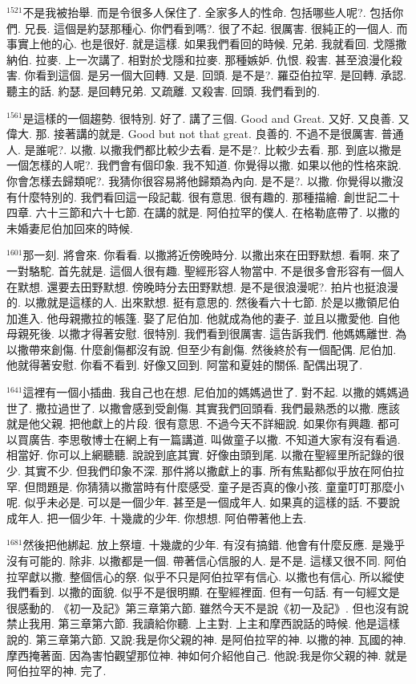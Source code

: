 \documentclass{book}
\begin{document}
$^{1521}$不是我被抬舉.
而是令很多人保住了.
全家多人的性命.
包括哪些人呢?.
包括你們.
兄長.
這個是約瑟那種心.
你們看到嗎?.
很了不起.
很厲害.
很純正的一個人.
而事實上他的心.
也是很好.
就是這樣.
如果我們看回的時候.
兄弟.
我就看回.
戈隱撒納伯.
拉麥.
上一次講了.
相對於戈隱和拉麥.
那種嫉妒.
仇恨.
殺害.
甚至浪漫化殺害.
你看到這個.
是另一個大回轉.
又是.
回頭.
是不是?.
羅亞伯拉罕.
是回轉.
承認.
聽主的話.
約瑟.
是回轉兄弟.
又疏離.
又殺害.
回頭.
我們看到的.

$^{1561}$是這樣的一個趨勢.
很特別.
好了.
講了三個.
Good and Great.
又好.
又良善.
又偉大.
那.
接著講的就是.
Good but not that great.
良善的.
不過不是很厲害.
普通人.
是誰呢?.
以撒.
以撒我們都比較少去看.
是不是?.
比較少去看.
那.
到底以撒是一個怎樣的人呢?.
我們會有個印象.
我不知道.
你覺得以撒.
如果以他的性格來說.
你會怎樣去歸類呢?.
我猜你很容易將他歸類為內向.
是不是?.
以撒.
你覺得以撒沒有什麼特別的.
我們看回這一段記載.
很有意思.
很有趣的.
那種描繪.
創世記二十四章.
六十三節和六十七節.
在講的就是.
阿伯拉罕的僕人.
在格勒底帶了.
以撒的未婚妻尼伯加回來的時候.

$^{1601}$那一刻.
將會來.
你看看.
以撒將近傍晚時分.
以撒出來在田野默想.
看啊.
來了一對駱駝.
首先就是.
這個人很有趣.
聖經形容人物當中.
不是很多會形容有一個人在默想.
還要去田野默想.
傍晚時分去田野默想.
是不是很浪漫呢?.
拍片也挺浪漫的.
以撒就是這樣的人.
出來默想.
挺有意思的.
然後看六十七節.
於是以撒領尼伯加進入.
他母親撒拉的帳篷.
娶了尼伯加.
他就成為他的妻子.
並且以撒愛他.
自他母親死後.
以撒才得著安慰.
很特別.
我們看到很厲害.
這告訴我們.
他媽媽離世.
為以撒帶來創傷.
什麼創傷都沒有說.
但至少有創傷.
然後終於有一個配偶.
尼伯加.
他就得著安慰.
你看不看到.
好像又回到.
阿當和夏娃的關係.
配偶出現了.

$^{1641}$這裡有一個小插曲.
我自己也在想.
尼伯加的媽媽過世了.
對不起.
以撒的媽媽過世了.
撒拉過世了.
以撒會感到受創傷.
其實我們回頭看.
我們最熟悉的以撒.
應該就是他父親.
把他獻上的片段.
很有意思.
不過今天不詳細說.
如果你有興趣.
都可以買廣告.
李思敬博士在網上有一篇講道.
叫做童子以撒.
不知道大家有沒有看過.
相當好.
你可以上網聽聽.
說說到底其實.
好像由頭到尾.
以撒在聖經里所記錄的很少.
其實不少.
但我們印象不深.
那件將以撒獻上的事.
所有焦點都似乎放在阿伯拉罕.
但問題是.
你猜猜以撒當時有什麼感受.
童子是否真的像小孩.
童童叮叮那麼小呢.
似乎未必是.
可以是一個少年.
甚至是一個成年人.
如果真的這樣的話.
不要說成年人.
把一個少年.
十幾歲的少年.
你想想.
阿伯帶著他上去.

$^{1681}$然後把他綁起.
放上祭壇.
十幾歲的少年.
有沒有搞錯.
他會有什麼反應.
是幾乎沒有可能的.
除非.
以撒都是一個.
帶著信心信服的人.
是不是.
這樣又很不同.
阿伯拉罕獻以撒.
整個信心的祭.
似乎不只是阿伯拉罕有信心.
以撒也有信心.
所以縱使我們看到.
以撒的面貌.
似乎不是很明顯.
在聖經裡面.
但有一句話.
有一句經文是很感動的.
《初一及記》第三章第六節.
雖然今天不是說《初一及記》.
但也沒有說禁止我用.
第三章第六節.
我讀給你聽.
上主對.
上主和摩西說話的時候.
他是這樣說的.
第三章第六節.
又說:我是你父親的神.
是阿伯拉罕的神.
以撒的神.
瓦國的神.
摩西掩著面.
因為害怕觀望那位神.
神如何介紹他自己.
他說:我是你父親的神.
就是阿伯拉罕的神.
完了.
\end{document}
